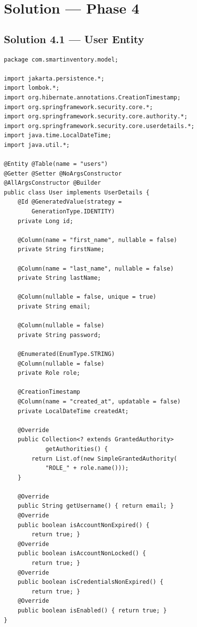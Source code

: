 \documentclass[12pt,a4paper]{report}
\begin{document}
\chapter{Solution --- Phase 4}

\section{Solution 4.1 --- User Entity}

\begin{lstlisting}[style=javastyle, title={model/User.java (implements UserDetails)}]
package com.smartinventory.model;

import jakarta.persistence.*;
import lombok.*;
import org.hibernate.annotations.CreationTimestamp;
import org.springframework.security.core.*;
import org.springframework.security.core.authority.*;
import org.springframework.security.core.userdetails.*;
import java.time.LocalDateTime;
import java.util.*;

@Entity @Table(name = "users")
@Getter @Setter @NoArgsConstructor
@AllArgsConstructor @Builder
public class User implements UserDetails {
    @Id @GeneratedValue(strategy =
        GenerationType.IDENTITY)
    private Long id;

    @Column(name = "first_name", nullable = false)
    private String firstName;

    @Column(name = "last_name", nullable = false)
    private String lastName;

    @Column(nullable = false, unique = true)
    private String email;

    @Column(nullable = false)
    private String password;

    @Enumerated(EnumType.STRING)
    @Column(nullable = false)
    private Role role;

    @CreationTimestamp
    @Column(name = "created_at", updatable = false)
    private LocalDateTime createdAt;

    @Override
    public Collection<? extends GrantedAuthority>
            getAuthorities() {
        return List.of(new SimpleGrantedAuthority(
            "ROLE_" + role.name()));
    }

    @Override
    public String getUsername() { return email; }
    @Override
    public boolean isAccountNonExpired() {
        return true; }
    @Override
    public boolean isAccountNonLocked() {
        return true; }
    @Override
    public boolean isCredentialsNonExpired() {
        return true; }
    @Override
    public boolean isEnabled() { return true; }
}
\end{lstlisting}
\end{document}
